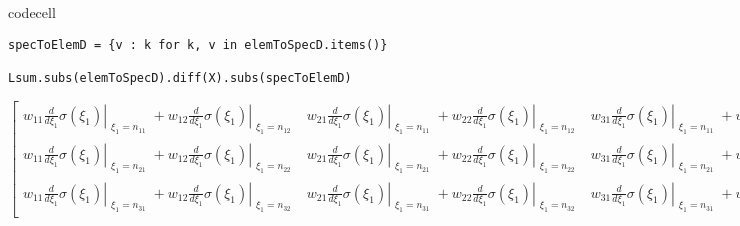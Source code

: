 codecell


\begin{verbatim}
specToElemD = {v : k for k, v in elemToSpecD.items()}

Lsum.subs(elemToSpecD).diff(X).subs(specToElemD)
\end{verbatim}

$\displaystyle \left[\begin{matrix}w_{11} \left. \frac{d}{d \xi_{1}} \sigma{\left(\xi_{1} \right)} \right|_{\substack{ \xi_{1}=n_{11} }} + w_{12} \left. \frac{d}{d \xi_{1}} \sigma{\left(\xi_{1} \right)} \right|_{\substack{ \xi_{1}=n_{12} }} & w_{21} \left. \frac{d}{d \xi_{1}} \sigma{\left(\xi_{1} \right)} \right|_{\substack{ \xi_{1}=n_{11} }} + w_{22} \left. \frac{d}{d \xi_{1}} \sigma{\left(\xi_{1} \right)} \right|_{\substack{ \xi_{1}=n_{12} }} & w_{31} \left. \frac{d}{d \xi_{1}} \sigma{\left(\xi_{1} \right)} \right|_{\substack{ \xi_{1}=n_{11} }} + w_{32} \left. \frac{d}{d \xi_{1}} \sigma{\left(\xi_{1} \right)} \right|_{\substack{ \xi_{1}=n_{12} }}\\w_{11} \left. \frac{d}{d \xi_{1}} \sigma{\left(\xi_{1} \right)} \right|_{\substack{ \xi_{1}=n_{21} }} + w_{12} \left. \frac{d}{d \xi_{1}} \sigma{\left(\xi_{1} \right)} \right|_{\substack{ \xi_{1}=n_{22} }} & w_{21} \left. \frac{d}{d \xi_{1}} \sigma{\left(\xi_{1} \right)} \right|_{\substack{ \xi_{1}=n_{21} }} + w_{22} \left. \frac{d}{d \xi_{1}} \sigma{\left(\xi_{1} \right)} \right|_{\substack{ \xi_{1}=n_{22} }} & w_{31} \left. \frac{d}{d \xi_{1}} \sigma{\left(\xi_{1} \right)} \right|_{\substack{ \xi_{1}=n_{21} }} + w_{32} \left. \frac{d}{d \xi_{1}} \sigma{\left(\xi_{1} \right)} \right|_{\substack{ \xi_{1}=n_{22} }}\\w_{11} \left. \frac{d}{d \xi_{1}} \sigma{\left(\xi_{1} \right)} \right|_{\substack{ \xi_{1}=n_{31} }} + w_{12} \left. \frac{d}{d \xi_{1}} \sigma{\left(\xi_{1} \right)} \right|_{\substack{ \xi_{1}=n_{32} }} & w_{21} \left. \frac{d}{d \xi_{1}} \sigma{\left(\xi_{1} \right)} \right|_{\substack{ \xi_{1}=n_{31} }} + w_{22} \left. \frac{d}{d \xi_{1}} \sigma{\left(\xi_{1} \right)} \right|_{\substack{ \xi_{1}=n_{32} }} & w_{31} \left. \frac{d}{d \xi_{1}} \sigma{\left(\xi_{1} \right)} \right|_{\substack{ \xi_{1}=n_{31} }} + w_{32} \left. \frac{d}{d \xi_{1}} \sigma{\left(\xi_{1} \right)} \right|_{\substack{ \xi_{1}=n_{32} }}\end{matrix}\right]$